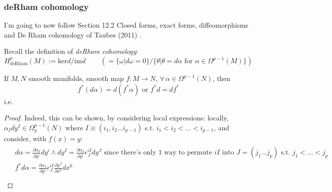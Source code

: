 \documentclass[10pt]{amsart}
\begin{document}
\begin{multicols}{2}
\subsubsection{deRham cohomology}

I'm going to now follow Section 12.2 Closed forms, exact forms, diffeomorphisms and De Rham cohomology of Taubes (2011) \cite{CTaubes2011}.  

Recall the definition of \emph{deRham cohomology}:
\begin{equation}
  H^p_{\text{deRham}}(M) := \text{ker}d/\text{im}d \qquad \, \left( = \lbrace \omega | d\omega = 0 \rbrace / \lbrace \theta | \theta = d\alpha \text{ for } \alpha \in \Omega^{p-1}(M) \rbrace \right)
\end{equation}

If $M,N$ smooth manifolds, smooth map $f: M \to N$, $\forall \, \alpha \in \Omega^{p-1}(N)$, then
\begin{equation}
  f^*(d\alpha ) =d(f^*\alpha) \text{ or } f^* d = df^*
\end{equation}
i.e.
\begin{proof}
Indeed, this can be shown, by considering local expressions: locally, $\alpha_I dy^I \in \Omega^{p-1}_y(N)$ where $I \equiv (i_1, i_2 \dots i_{p-1})$ s.t. $i_1 < i_2 < \dots < i_{p-1}$, and consider, with $f(x)=y$:
\[
\begin{gathered}
  \begin{aligned}
    & d\alpha = \frac{ \partial \alpha_I}{ \partial y^i} dy^i \wedge dy^I = \frac{ \partial \alpha_I}{\partial y^i} \epsilon^{iI }_J dy^J \text{ since there's only 1 way to permute $iI$ into $J=(j_1 \dots j_p)$ s.t. $j_1 < \dots < j_p$ } \\ 
    & f^*d\alpha = \frac{ \partial \alpha_I}{ \partial y^i} \epsilon^{iI}_J \frac{ \partial y^J}{ \partial x^k} dx^k \\ 

\end{aligned}
\end{gathered}\]
\end{proof}
\end{multicols}
\end{document}
